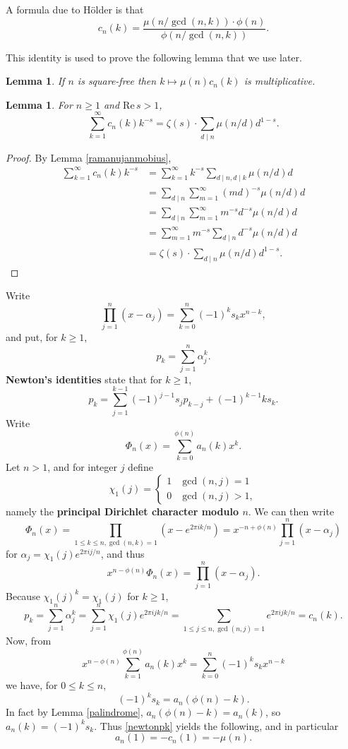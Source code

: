 \documentclass{article}
\def\Re{\ensuremath{\mathrm{Re}}\,}
\newtheorem{lemma}[theorem]{Lemma}
\theoremstyle{definition}
\begin{document}
A formula due to H\"older \cite[p.~110, Theorem 4.1]{montgomery} is that  
\begin{equation}
c_n(k) = \frac{\mu(n/\gcd(n,k))\cdot \phi(n)}{\phi(n/\gcd(n,k))}.
\label{holder}
\end{equation}

This identity is used to prove the following lemma that we  use later.

\begin{lemma}
If $n$ is square-free then $k \mapsto \mu(n) c_n(k)$ is multiplicative. 
\label{squarefree}
\end{lemma}



\begin{lemma}
For $n \geq 1$ and $\Re s>1$,
\[
\sum_{k=1}^\infty c_n(k) k^{-s} = \zeta(s) \cdot \sum_{d \mid n} \mu(n/d) d^{1-s}.
\]
\label{ramanujandirichlet}
\end{lemma}
\begin{proof}
By Lemma \ref{ramanujanmobius},
\begin{align*}
\sum_{k=1}^\infty c_n(k) k^{-s} &=\sum_{k=1}^\infty k^{-s} \sum_{d \mid n, d \mid k} \mu(n/d) d\\
&=\sum_{d \mid n} \sum_{m=1}^\infty (md)^{-s} \mu(n/d) d\\
&=\sum_{d \mid n} \sum_{m=1}^\infty m^{-s} d^{-s} \mu(n/d) d\\
&=\sum_{m=1}^\infty m^{-s} \sum_{d \mid n} d^{-s} \mu(n/d) d\\
&=\zeta(s) \cdot \sum_{d \mid n} \mu(n/d) d^{1-s}.
\end{align*}
\end{proof}



Write
\[
\prod_{j=1}^n (x-\alpha_j) = \sum_{k=0}^n (-1)^k s_k x^{n-k},
\]
and put, for $k \geq 1$,
\[
p_k = \sum_{j=1}^n \alpha_j^k.
\]
\textbf{Newton's identities} \cite[p.~32, Proposition 3.4]{escofier} state that for $k \geq 1$,
\begin{equation}
p_k = \sum_{j=1}^{k-1} (-1)^{j-1} s_j p_{k-j} + (-1)^{k-1} k s_k.
\label{newtonpk}
\end{equation}
Write
\[
\Phi_n(x) = \sum_{k=0}^{\phi(n)} a_n(k) x^k.
\]
Let $n > 1$, and for  integer $j$ define
\[
\chi_1(j) = \begin{cases}
1&\gcd(n,j)=1\\
0&\gcd(n,j)>1,
\end{cases}
\]
namely the \textbf{principal Dirichlet character modulo $n$}. 
We can then write 
\[
\Phi_n(x) = \prod_{1 \leq k \leq n, \gcd(n,k)=1} (x-e^{2\pi ik/n})
=x^{-n+\phi(n)}  \prod_{j=1}^n (x-\alpha_j)
\]
for
 $\alpha_j = \chi_1(j) e^{2\pi ij/n}$, and thus
 \[
x^{n-\phi(n)} \Phi_n(x) = \prod_{j=1}^n (x-\alpha_j).
 \]
Because $\chi_1(j)^k=\chi_1(j)$ for $k \geq 1$,
\[
p_k = \sum_{j=1}^n \alpha_j^k = \sum_{j=1}^n \chi_1(j) e^{2\pi ijk/n}
=\sum_{1 \leq j \leq n, \gcd(n,j)=1} e^{2\pi ijk/n} = c_n(k).
\]
Now, from
\[
x^{n-\phi(n)} \sum_{k=1}^{\phi(n)}  a_n(k) x^k =  \sum_{k=0}^n (-1)^k s_k x^{n-k}
\]
we have, for $0 \leq k \leq n$,
\[
(-1)^k s_k = a_n(\phi(n)-k).
\]
In fact by Lemma \ref{palindrome}, $a_n(\phi(n)-k)=a_n(k)$, so $a_n(k) = (-1)^k s_k$. 
Thus \eqref{newtonpk} yields the following,
and in particular 
\[
a_n(1) = -c_n(1) = -\mu(n).
\]
\end{document}

